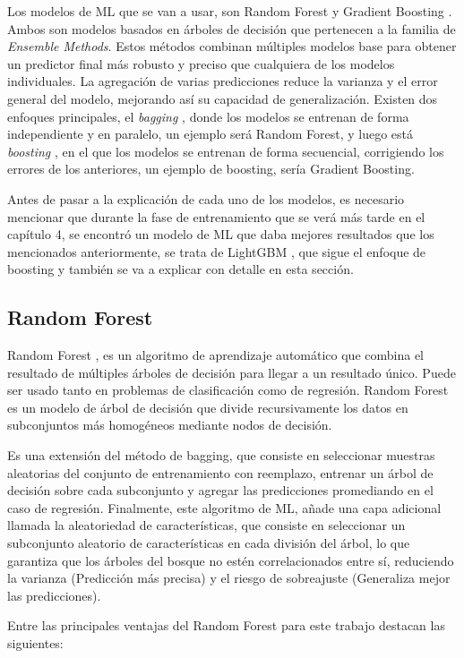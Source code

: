 Los modelos de ML que se van a usar, son Random Forest \cite{ibm_random_forest} y Gradient Boosting \cite{scikit_gb}. Ambos son modelos basados en árboles de decisión que pertenecen a la familia de \emph{Ensemble Methods}. Estos métodos combinan múltiples modelos base para obtener un predictor final más robusto y preciso que cualquiera de los modelos individuales. La agregación de varias predicciones reduce la varianza y el error general del modelo, mejorando así su capacidad de generalización. Existen dos enfoques principales, el \emph{bagging} \cite{bagging}, donde los modelos se entrenan de forma independiente y en paralelo, un ejemplo será Random Forest, y luego está \emph{boosting} \cite{boosting}, en el que los modelos se entrenan de forma secuencial, corrigiendo los errores de los anteriores, un ejemplo de boosting, sería Gradient Boosting.

Antes de pasar a la explicación de cada uno de los modelos, es necesario mencionar que durante la fase de entrenamiento que se verá más tarde en el capítulo 4, se encontró un modelo de ML que daba mejores resultados que los mencionados anteriormente, se trata de LightGBM \cite{lightgbm}, que sigue el enfoque de boosting y también se va a explicar con detalle en esta sección.
\subsection{Random Forest}
Random Forest \cite{scikit_rf}, es un algoritmo de aprendizaje automático que combina el resultado de múltiples árboles de decisión para llegar a un resultado único. Puede ser usado tanto en problemas de clasificación como de regresión. Random Forest es un modelo de árbol de decisión que divide recursivamente los datos en subconjuntos más homogéneos mediante nodos de decisión.

Es una extensión del método de bagging, que consiste en seleccionar muestras aleatorias del conjunto de entrenamiento con reemplazo, entrenar un árbol de decisión sobre cada subconjunto y agregar las predicciones promediando en el caso de regresión. Finalmente, este algoritmo de ML, añade una capa adicional llamada la aleatoriedad de características, que consiste en seleccionar un subconjunto aleatorio de características en cada división del árbol, lo que garantiza que los árboles del bosque no estén correlacionados entre sí, reduciendo la varianza (Predicción más precisa) y el riesgo de sobreajuste (Generaliza mejor las predicciones).

Entre las principales ventajas del Random Forest para este trabajo destacan las siguientes:

